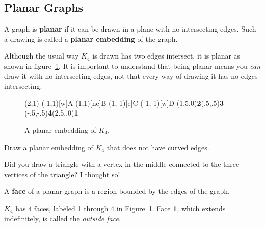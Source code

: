 \subsection{Planar Graphs}\label{sec:planar}
\begin{df}
A graph is {\bf planar} 
if it can be drawn in
a plane with no intersecting edges.
Such a drawing is called a {\bf planar embedding} of the graph.
\end{df}
\begin{exa}
Although the usual way $K_4$ is drawn has two edges intersect, 
it is planar as shown in figure~\ref{fig:faces_k4}.
It is important to understand that being planar means you {\em can} draw it with no intersecting edges, not that every way of drawing it has no edges intersecting.
\end{exa}
\begin{figure}[h]
\centering
\begin{graph}(2,1)
(-1,1)[w]{A}
(1,1)[ne]{B}
(1,-1)[e]{C}
(-1,-1)[w]{D}
 
 \freetext(1.5,0){{\bf 2}}\freetext(.5,.5){{\bf 3}}
\freetext(-.5,-.5){{\bf 4}}\freetext(2.5,.0){{\bf 1}}
\end{graph}
\vspace*{.75in}\caption{A planar embedding of $K_4$.}\label{fig:faces_k4}
\end{figure}

\begin{exer}
Draw a planar embedding of $K_4$ that does not have curved edges.

\vspace*{1.25in}
\begin{answer}
Did you draw a triangle with a vertex in the middle connected to the
three vertices of the triangle? I thought so!
\end{answer}
\end{exer}

\begin{df}
A {\bf face} of a planar graph is a region bounded by
the edges of the graph.
\end{df}

\begin{exa}\label{exa:faces_k4}
$K_4$ has $4$ faces, labeled 1 through 
4 in Figure~\ref{fig:faces_k4}. 
Face {\bf 1}, which extends indefinitely, 
is called the {\em outside face}.
\end{exa}


